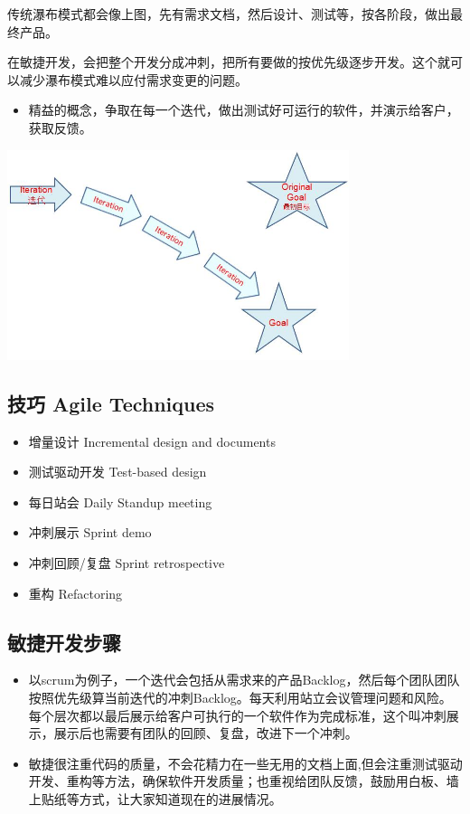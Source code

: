 传统瀑布模式都会像上图，先有需求文档，然后设计、测试等，按各阶段，做出最终产品。

在敏捷开发，会把整个开发分成冲刺，把所有要做的按优先级逐步开发。这个就可以减少瀑布模式难以应付需求变更的问题。

\begin{itemize}
\tightlist
\item
  精益的概念，争取在每一个迭代，做出测试好可运行的软件，并演示给客户，获取反馈。
\end{itemize}

\includegraphics[width=10cm]{P11.jpg}

\hypertarget{ux6280ux5de7-agile-techniques}{%
\subsection{技巧 Agile Techniques}\label{ux6280ux5de7-agile-techniques}}

\begin{itemize}
\tightlist
\item
  增量设计 Incremental design and documents
\item
  测试驱动开发 Test-based design
\item
  每日站会 Daily Standup meeting
\item
  冲刺展示 Sprint demo
\item
  冲刺回顾/复盘 Sprint retrospective
\item
  重构 Refactoring
\end{itemize}

\hypertarget{ux654fux6377ux5f00ux53d1ux6b65ux9aa4}{%
\subsection{敏捷开发步骤}\label{ux654fux6377ux5f00ux53d1ux6b65ux9aa4}}

\begin{itemize}
\tightlist
\item
  以scrum为例子，一个迭代会包括从需求来的产品Backlog，然后每个团队团队按照优先级算当前迭代的冲刺Backlog。每天利用站立会议管理问题和风险。每个层次都以最后展示给客户可执行的一个软件作为完成标准，这个叫冲刺展示，展示后也需要有团队的回顾、复盘，改进下一个冲刺。\\
\item
  敏捷很注重代码的质量，不会花精力在一些无用的文档上面,但会注重测试驱动开发、重构等方法，确保软件开发质量；也重视给团队反馈，鼓励用白板、墙上贴纸等方式，让大家知道现在的进展情况。
\end{itemize}

